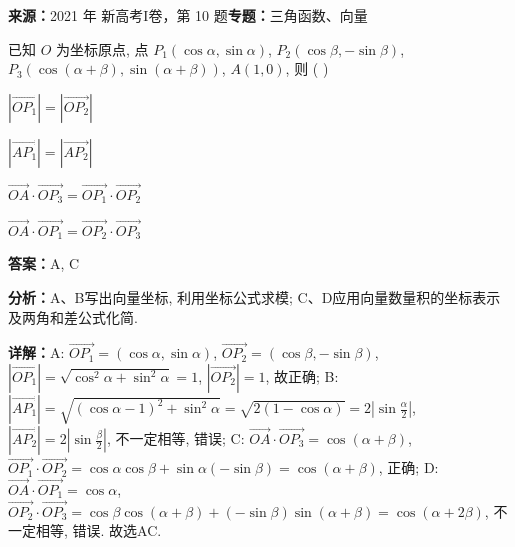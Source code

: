 \begin{question}[points=5]
\textbf{来源：}2021 年 新高考I卷，第 10 题\quad \textbf{专题：}三角函数、向量\par
已知 $O$ 为坐标原点, 点 $P_1(\cos\alpha, \sin\alpha)$, $P_2(\cos\beta, -\sin\beta)$, $P_3(\cos(\alpha+\beta), \sin(\alpha+\beta))$, $A(1,0)$, 则 ( )
\begin{choices}
  \item $|\overrightarrow{OP_1}| = |\overrightarrow{OP_2}|$
  \item $|\overrightarrow{AP_1}| = |\overrightarrow{AP_2}|$
  \item $\overrightarrow{OA} \cdot \overrightarrow{OP_3} = \overrightarrow{OP_1} \cdot \overrightarrow{OP_2}$
  \item $\overrightarrow{OA} \cdot \overrightarrow{OP_1} = \overrightarrow{OP_2} \cdot \overrightarrow{OP_3}$
\end{choices}
\begin{solution}
\textbf{答案：}A, C

\textbf{分析：}A、B写出向量坐标, 利用坐标公式求模; C、D应用向量数量积的坐标表示及两角和差公式化简.

\textbf{详解：}A: $\overrightarrow{OP_1} = (\cos\alpha, \sin\alpha)$, $\overrightarrow{OP_2} = (\cos\beta, -\sin\beta)$, $|\overrightarrow{OP_1}| = \sqrt{\cos^2\alpha + \sin^2\alpha} = 1$, $|\overrightarrow{OP_2}| = 1$, 故正确; B: $|\overrightarrow{AP_1}| = \sqrt{(\cos\alpha-1)^2 + \sin^2\alpha} = \sqrt{2(1-\cos\alpha)} = 2|\sin\frac{\alpha}{2}|$, $|\overrightarrow{AP_2}| = 2|\sin\frac{\beta}{2}|$, 不一定相等, 错误; C: $\overrightarrow{OA} \cdot \overrightarrow{OP_3} = \cos(\alpha+\beta)$, $\overrightarrow{OP_1} \cdot \overrightarrow{OP_2} = \cos\alpha\cos\beta + \sin\alpha(-\sin\beta) = \cos(\alpha+\beta)$, 正确; D: $\overrightarrow{OA} \cdot \overrightarrow{OP_1} = \cos\alpha$, $\overrightarrow{OP_2} \cdot \overrightarrow{OP_3} = \cos\beta\cos(\alpha+\beta) + (-\sin\beta)\sin(\alpha+\beta) = \cos(\alpha+2\beta)$, 不一定相等, 错误. 故选AC.
\end{solution}
\end{question}

